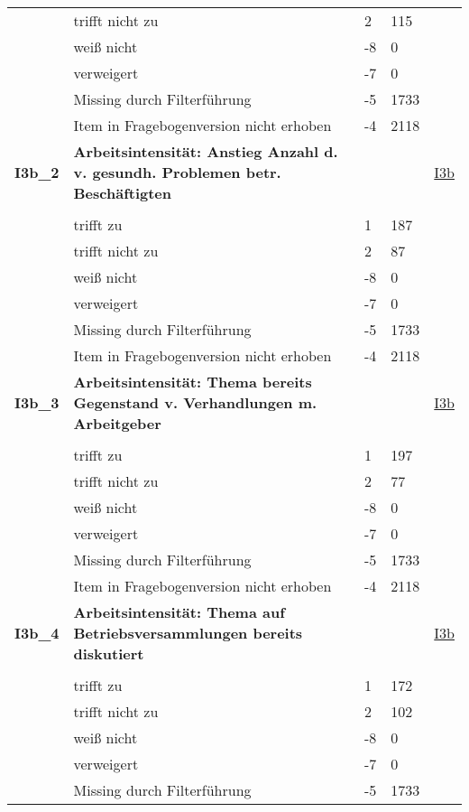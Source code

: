 \begin{longtable}{| L{2.5cm} | L{8.25cm}| C{1.5cm} | R{1.25cm} | C{2.25cm} |  }
   & trifft nicht zu & 2 & 115 &  \\ 
   & weiß nicht & -8 & 0 &  \\ 
   & verweigert & -7 & 0 &  \\ 
   & Missing durch Filterführung & -5 & 1733 &  \\ 
   & Item in Fragebogenversion nicht erhoben & -4 & 2118 &  \\ 
   \midrule
\textbf{I3b\_2}\label{var:suf:I3b:2} & \textbf{Arbeitsintensität: Anstieg Anzahl d. v. gesundh. Problemen betr. Beschäftigten} &  &  & \hyperref[I3b]{I3b} \\ 
   &  &  &  &  \\ 
   & trifft zu & 1 & 187 &  \\ 
   & trifft nicht zu & 2 & 87 &  \\ 
   & weiß nicht & -8 & 0 &  \\ 
   & verweigert & -7 & 0 &  \\ 
   & Missing durch Filterführung & -5 & 1733 &  \\ 
   & Item in Fragebogenversion nicht erhoben & -4 & 2118 &  \\ 
   \midrule
\textbf{I3b\_3}\label{var:suf:I3b:3} & \textbf{Arbeitsintensität: Thema bereits Gegenstand v. Verhandlungen m. Arbeitgeber} &  &  & \hyperref[I3b]{I3b} \\ 
   &  &  &  &  \\ 
   & trifft zu & 1 & 197 &  \\ 
   & trifft nicht zu & 2 & 77 &  \\ 
   & weiß nicht & -8 & 0 &  \\ 
   & verweigert & -7 & 0 &  \\ 
   & Missing durch Filterführung & -5 & 1733 &  \\ 
   & Item in Fragebogenversion nicht erhoben & -4 & 2118 &  \\ 
   \midrule
\textbf{I3b\_4}\label{var:suf:I3b:4} & \textbf{Arbeitsintensität: Thema auf Betriebsversammlungen bereits diskutiert} &  &  & \hyperref[I3b]{I3b} \\ 
   &  &  &  &  \\ 
   & trifft zu & 1 & 172 &  \\ 
   & trifft nicht zu & 2 & 102 &  \\ 
   & weiß nicht & -8 & 0 &  \\ 
   & verweigert & -7 & 0 &  \\ 
   & Missing durch Filterführung & -5 & 1733 &  \\ 

\end{longtable}
